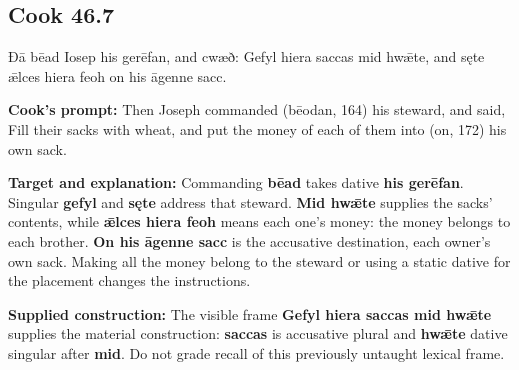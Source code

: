 \par\begin{minipage}{\linewidth}\raggedright
\subsection*{Cook 46.7}

Ðā bēad Iosep his gerēfan, and cwæð: Gefyl hiera saccas mid hwǣte, and sęte ǣlces hiera feoh on his āgenne sacc.

\textbf{Cook’s prompt:} Then Joseph commanded (bēodan, 164) his steward, and said, Fill their sacks with wheat, and put the money of each of them into (on, 172) his own sack.

\textbf{Target and explanation:} Commanding \textbf{bēad} takes dative \textbf{his gerēfan}. Singular \textbf{gefyl} and \textbf{sęte} address that steward. \textbf{Mid hwǣte} supplies the sacks’ contents, while \textbf{ǣlces hiera feoh} means each one’s money: the money belongs to each brother. \textbf{On his āgenne sacc} is the accusative destination, each owner’s own sack. Making all the money belong to the steward or using a static dative for the placement changes the instructions.

\textbf{Supplied construction:} The visible frame \textbf{Gefyl hiera saccas mid hwǣte} supplies the material construction: \textbf{saccas} is accusative plural and \textbf{hwǣte} dative singular after \textbf{mid}. Do not grade recall of this previously untaught lexical frame.

\end{minipage}\par\addvspace{4pt}


